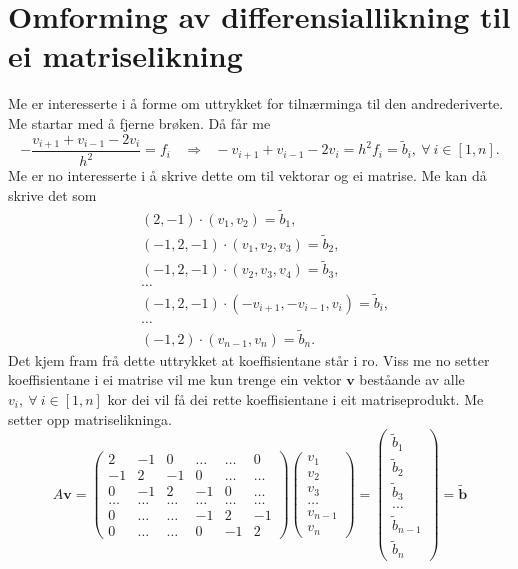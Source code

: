 \documentclass[11pt, a4paper]{article}
\begin{document}
\section{Omforming av differensiallikning til ei matriselikning}
  Me er interesserte i å forme om uttrykket for tilnærminga til den andrederiverte. Me startar med å 
  fjerne brøken. Då får me
  \begin{equation*}
    -\frac{v_{i+1} + v_{i-1} - 2v_i}{h^2} = f_i \ \ \ \ \Rightarrow \ \ \
    -v_{i+1} + v_{i-1} - 2v_i = h^2f_i = \tilde{b}_i, \ \forall \ i \in [1, n].
  \end{equation*}
  Me er no interesserte i å skrive dette om til vektorar og ei matrise. Me kan då skrive det som
  \begin{align*}
    &(2, -1)\cdot(v_1, v_2) = \tilde{b}_1, \\
    &(-1, 2, -1)\cdot(v_1, v_2, v_3) = \tilde{b}_2, \\
    &(-1, 2, -1)\cdot(v_2, v_3, v_4) = \tilde{b}_3, \\
    &\dots \\
    &(-1, 2, -1)\cdot(-v_{i+1}, -v_{i-1}, v_i) = \tilde{b}_i, \\
    &\dots \\
    &(-1, 2)\cdot(v_{n-1}, v_{n}) = \tilde{b}_n.
  \end{align*}
  Det kjem fram frå dette uttrykket at koeffisientane står i ro. Viss me no setter koeffisientane i ei
  matrise vil me kun trenge ein vektor $\mathbf{v}$ beståande av alle $v_i, \ \forall \ i \in [1, n]$
  kor dei vil få dei rette koeffisientane i eit matriseprodukt. Me setter opp matriselikninga.
  \begin{equation*}
    A\mathbf{v} = 
    \begin{pmatrix}
      2 & -1 & 0 & \dots & \dots & 0 \\
      -1 & 2 & -1 & 0 & \dots & \dots \\
      0 & -1 & 2 & -1 & 0 & \dots \\
      \dots & \dots & \dots & \dots & \dots & \dots \\
      0 & \dots & \dots & -1 & 2 & -1 \\
      0 & \dots & \dots & 0 & -1 & 2
    \end{pmatrix}
    \begin{pmatrix}
      v_1 \\
      v_2 \\
      v_3 \\
      \dots \\
      v_{n-1} \\
      v_{n}
    \end{pmatrix} = 
    \begin{pmatrix}
      \tilde{b}_1 \\
      \tilde{b}_2 \\
      \tilde{b}_3 \\       
      \dots \\
      \tilde{b}_{n-1} \\
      \tilde{b}_n
    \end{pmatrix} = \mathbf{\tilde{b}}
  \end{equation*}
\end{document}
